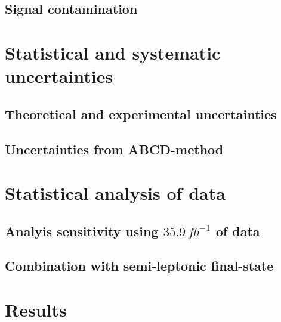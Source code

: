 \subsection{Signal contamination}

\section{Statistical and systematic uncertainties}
\subsection{Theoretical and experimental uncertainties}
\subsection{Uncertainties from ABCD-method}

\section{Statistical analysis of data}
\subsection{Analyis sensitivity using $35.9\,fb^{-1}$ of data}
\subsection{Combination with semi-leptonic final-state}

\section{Results}



